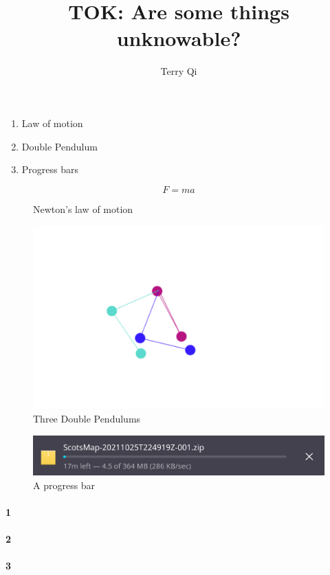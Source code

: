 \documentclass[a4paper,12pt]{article}
\title{TOK: Are some things unknowable?}
\author{Terry Qi}
\begin{document}
\maketitle
\begin{enumerate}
 \item Law of motion
 \item Double Pendulum
 \item Progress bars
\end{enumerate}

\begin{figure}[h!]
 \centering
 \[
    F = ma
 \]
 \caption{Newton's law of motion}
\end{figure}

\begin{figure}[h!]
 \centering
 \includegraphics[scale=0.25]{dpend.png}
 \caption{Three Double Pendulums}
\end{figure}

\begin{figure}[h!]
 \centering
 \includegraphics[scale=0.35]{progress.png}
 \caption{A progress bar}
\end{figure}



\newpage

\paragraph{1}

\paragraph{2}

\paragraph{3}
\end{document}
